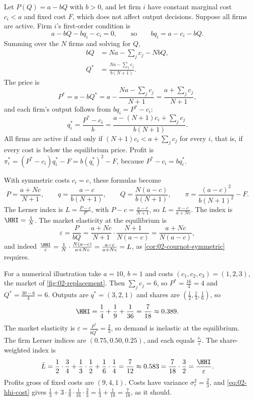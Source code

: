 \begin{example}\label{ex:02-linear-cournot}
Let $P(Q) = a - bQ$ with $b > 0$, and let firm $i$ have constant marginal cost $c_i < a$ and fixed cost $F$, which
does not affect output decisions. Suppose all firms are active. Firm $i$'s first-order condition is
\[
  a - bQ - bq_i - c_i = 0, \qquad\text{so}\qquad bq_i = a - c_i - bQ .
\]
Summing over the $N$ firms and solving for $Q$,
\begin{align*}
  bQ &= Na - \sum_j c_j - NbQ, \\
  Q^* &= \frac{Na - \sum_j c_j}{b(N + 1)} .
\end{align*}
The price is
\[
  P^* = a - bQ^* = a - \frac{Na - \sum_j c_j}{N + 1} = \frac{a + \sum_j c_j}{N + 1},
\]
and each firm's output follows from $bq_i = P^* - c_i$:
\[
  q_i^* = \frac{P^* - c_i}{b} = \frac{a - (N + 1)c_i + \sum_j c_j}{b(N + 1)} .
\]
All firms are active if and only if $(N + 1)c_i < a + \sum_j c_j$ for every $i$, that is, if every cost is below
the equilibrium price. Profit is $\pi_i^* = (P^* - c_i)q_i^* - F = b(q_i^*)^2 - F$, because $P^* - c_i = bq_i^*$.

With symmetric costs $c_i = c$, these formulas become
\[
  P = \frac{a + Nc}{N + 1}, \qquad q = \frac{a - c}{b(N + 1)}, \qquad Q = \frac{N(a - c)}{b(N + 1)}, \qquad
  \pi = \frac{(a - c)^2}{b(N + 1)^2} - F .
\]
The Lerner index is $L = \frac{P - c}{P}$, with $P - c = \frac{a - c}{N + 1}$, so $L = \frac{a - c}{a + Nc}$. The
index is $\HHI = \frac{1}{N}$. The market elasticity at the equilibrium is
\[
  \varepsilon = \frac{P}{bQ} = \frac{a + Nc}{N + 1}\cdot\frac{N + 1}{N(a - c)} = \frac{a + Nc}{N(a - c)},
\]
and indeed $\frac{\HHI}{\varepsilon} = \frac{1}{N}\cdot\frac{N(a - c)}{a + Nc} = \frac{a - c}{a + Nc} = L$, as
\cref{cor:02-cournot-symmetric} requires.

For a numerical illustration take $a = 10$, $b = 1$ and costs $(c_1, c_2, c_3) = (1, 2, 3)$, the market of
\cref{fig:02-replacement}. Then $\sum_j c_j = 6$, so $P^* = \frac{16}{4} = 4$ and $Q^* = \frac{30 - 6}{4} = 6$.
Outputs are $q^* = (3, 2, 1)$ and shares are $\left(\frac{1}{2}, \frac{1}{3}, \frac{1}{6}\right)$, so
\[
  \HHI = \frac{1}{4} + \frac{1}{9} + \frac{1}{36} = \frac{7}{18} \approx 0.389 .
\]
The market elasticity is $\varepsilon = \frac{P^*}{bQ^*} = \frac{2}{3}$, so demand is inelastic at the equilibrium.
The firm Lerner indices are $(0.75, 0.50, 0.25)$, and each equals $\frac{s_i}{\varepsilon}$. The share-weighted
index is
\[
  \bar L = \frac{1}{2}\cdot\frac{3}{4} + \frac{1}{3}\cdot\frac{1}{2} + \frac{1}{6}\cdot\frac{1}{4} = \frac{7}{12}
  \approx 0.583 = \frac{7}{18}\cdot\frac{3}{2} = \frac{\HHI}{\varepsilon} .
\]
Profits gross of fixed costs are $(9, 4, 1)$. Costs have variance $\sigma_c^2 = \frac{2}{3}$, and
\eqref{eq:02-hhi-cost} gives $\frac{1}{3} + 3\cdot\frac{4}{9}\cdot\frac{1}{16}\cdot\frac{2}{3} = \frac{1}{3} +
\frac{1}{18} = \frac{7}{18}$, as it should.
\end{example}

